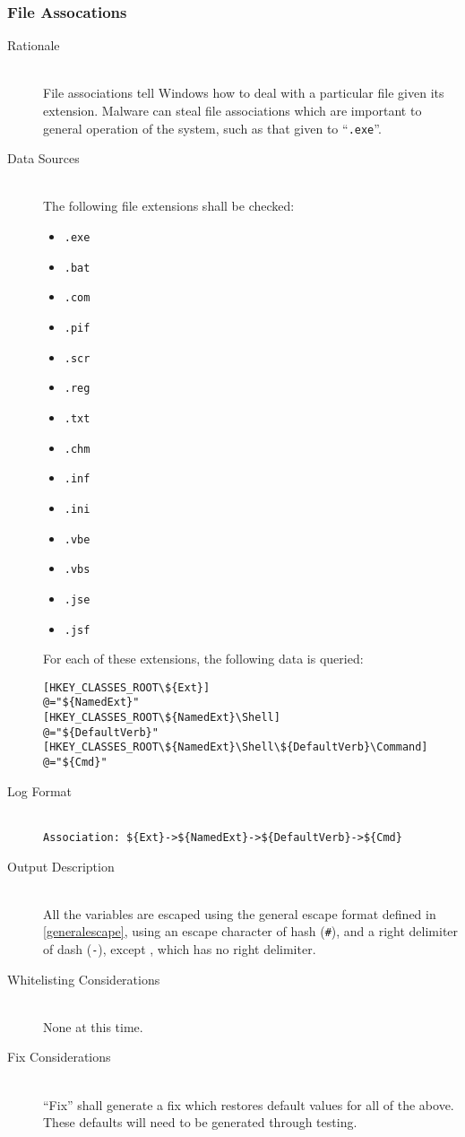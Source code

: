 \subsubsection{File Assocations}
\begin{description}
\item[Rationale] \hfill \\
File associations tell Windows how to deal with a particular file given its
extension. Malware can steal file associations which are important to general
operation of the system, such as that given to ``\verb|.exe|''.
\item[Data Sources] \hfill \\
The following file extensions shall be checked:
\begin{itemize}
    \item \verb|.exe|
    \item \verb|.bat|
    \item \verb|.com|
    \item \verb|.pif|
    \item \verb|.scr|
    \item \verb|.reg|
    \item \verb|.txt|
    \item \verb|.chm|
    \item \verb|.inf|
    \item \verb|.ini|
    \item \verb|.vbe|
    \item \verb|.vbs|
    \item \verb|.jse|
    \item \verb|.jsf|
\end{itemize}

For each of these extensions, the following data is queried:

\vspace{-\baselineskip}
\begin{verbatim}
[HKEY_CLASSES_ROOT\${Ext}]
@="${NamedExt}"
[HKEY_CLASSES_ROOT\${NamedExt}\Shell]
@="${DefaultVerb}"
[HKEY_CLASSES_ROOT\${NamedExt}\Shell\${DefaultVerb}\Command]
@="${Cmd}"
\end{verbatim}
\item[Log Format] \hfill \\
\verb|Association: ${Ext}->${NamedExt}->${DefaultVerb}->${Cmd}|
\item[Output Description] \hfill \\
All the variables are escaped using the general escape format defined in
\ref{generalescape}, using an escape character of hash (\verb|#|), and a right
delimiter of dash (\verb|-|), except , which has no right delimiter.
\item[Whitelisting Considerations] \hfill \\
None at this time.
\item[Fix Considerations] \hfill \\
``Fix'' shall generate a fix which restores default values for all of the above.
These defaults will need to be generated through testing.
\end{description}

